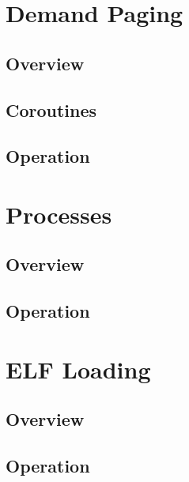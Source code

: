 \documentclass[12pt]{article}
\begin{document}
\section{Demand Paging}
\subsection{Overview}
\subsection{Coroutines}
\subsection{Operation}

\section{Processes}
\subsection{Overview}
\subsection{Operation}

\section{ELF Loading}
\subsection{Overview}
\subsection{Operation}
\end{document}
